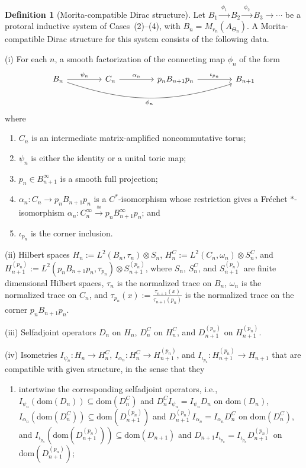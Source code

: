 \documentclass[11pt]{amsart}
\theoremstyle{definition}
\newtheorem{definition}[theorem]{Definition}
\theoremstyle{remark}
\newcommand{\dom}{\mathrm{dom}}
\begin{document}
\begin{definition}[Morita-compatible Dirac structure]
\label{def:morita-compatible-dirac-data}
Let $B_1\xrightarrow{\ \phi_1\ }B_2\xrightarrow{\ \phi_2\ }B_3\xrightarrow{}\cdots$
be a protoral inductive system of Cases~\textup{(2)}--\textup{(4)}, with $B_n=M_{r_n}(A_{\Theta_n}).$
A Morita-compatible Dirac structure for this system consists of
the following data.
\smallskip

\noindent
\textup{(i)} For each $n$, a smooth factorization of the connecting map $\phi_n$ of the form
\[
\begin{tikzcd}[column sep=4.2em, row sep=3.6em]
B_n
  \arrow[r, "\psi_n"]
  \arrow[rrr, bend right=18, swap, "\phi_n"]
&
C_n
  \arrow[r, "\alpha_n"]
&
p_nB_{n+1}p_n
  \arrow[r, "\iota_{p_n}"]
&
B_{n+1}\end{tikzcd}
\]
where \begin{enumerate}
\item[\textup{($i_a$)}] $C_n$ is an
intermediate matrix-amplified noncommutative torus;
\item[($i_b$)] $\psi_n$ is either the identity or a unital toric map;
\item[($i_c$)] $p_n\in B_{n+1}^\infty$
is a smooth full projection;
\item[\textup{($i_d$)}] $\alpha_n\colon C_n\to p_nB_{n+1}p_n$ is a
$C^*$-isomorphism whose restriction gives a Fréchet $*$-isomorphism $\alpha_n\colon C_n^\infty\xrightarrow{\cong}p_nB_{n+1}^\infty p_n$; and
\item[\textup{($i_e$)}] $\iota_{p_n}$ is the corner inclusion.
\end{enumerate}
\smallskip
\noindent
\textup{(ii)} Hilbert spaces $H_n:=L^2(B_n,\tau_n)\otimes S_n$, $H_n^C:=L^2(C_n,\omega_n)\otimes S_n^C$, and $H_{n+1}^{(p_n)}
:=
L^2(p_nB_{n+1}p_n,\tau_{p_n})\otimes S_{n+1}^{(p_n)}$, where $S_n$,  $S_n^C$, and $S_{n+1}^{(p_n)}$ are finite dimensional Hilbert spaces, $\tau_n$ is the normalized trace on $B_n$,  $\omega_n$ is the normalized trace on $C_n$, and $\tau_{p_n}(x)
:=
\frac{\tau_{n+1}(x)}{\tau_{n+1}(p_n)}$
is the normalized trace on the corner $p_nB_{n+1}p_n$.

\smallskip
\noindent
\textup{(iii)} Selfadjoint
operators
$D_n$
on $H_n$, $D_n^C$ on $H_n^C$, and $D_{n+1}^{(p_n)}$ on $H_{n+1}^{(p_n)}$. 


\smallskip
\noindent
\textup{(iv)} Isometries $I_{\psi_n}:H_n\to H_n^C$, $I_{\alpha_n}\colon H_n^C\to H_{n+1}^{(p_n)}$, and  $I_{\iota_{p_n}}:H_{n+1}^{(p_n)}\to H_{n+1}$ that are compatible with given structure, in the sense that they
\begin{enumerate}
\item[($iv_a$)] intertwine the corresponding selfadjoint operators, i.e.,  $I_{\psi_n}(\dom (D_n))\subseteq \dom (D_n^C)$ and $D_n^C I_{\psi_n}=I_{\psi_n}D_n$ on $\dom (D_n)$, $I_{\alpha_n}(\dom (D_n^C))\subseteq \dom (D_{n+1}^{(p_n)})$ and 
$D_{n+1}^{(p_n)}I_{\alpha_n}=I_{\alpha_n}D_n^C$ on $\dom (D_n^C)$, and $I_{\iota_{p_n}}(\dom (D_{n+1}^{(p_n)}))
\subseteq
\dom (D_{n+1})$
and $D_{n+1}I_{\iota_{p_n}}
=
I_{\iota_{p_n}}D_{n+1}^{(p_n)}$
on $\dom (D_{n+1}^{(p_n)})$;


\end{enumerate}
\end{definition}
\end{document}
